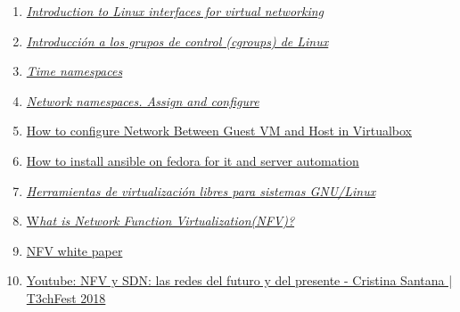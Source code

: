 \documentclass[12pt]{article}
\begin{document}
\begin{enumerate}
		\item
		\label{bib:virtual interface list}
		\href{https://developers.redhat.com/blog/2018/10/22/introduction-to-linux-interfaces-for-virtual-networking#veth}{\textit{Introduction to Linux interfaces for virtual networking}}
		
		
		\item
		\label{bib:link12}
		\href{https://elpuig.xeill.net/Members/vcarceler/articulos/introduccion-a-los-grupos-de-control-cgroups-de-linux}{\textit{Introducción a los grupos de control (cgroups) de Linux}}
		
		\item
		\label{bib:time ns kernel}
		\href{https://git.kernel.org/pub/scm/linux/kernel/git/tip/tip.git/commit/?h=timers/core&id=769071ac9f20b6a447410c7eaa55d1a5233ef40c}{\textit{Time namespaces}}
		
		\item
		\label{bib:example netns veth}
		\href{https://blog.scottlowe.org/2013/09/04/introducing-linux-network-namespaces/}{\textit{Network namespaces. Assign and configure}}
		
		
		\item
		\label{bib:configure host-only}
		\href{https://www.tecmint.com/network-between-guest-vm-and-host-virtualbox/}{How to configure Network Between Guest VM and Host in Virtualbox}
		
		
		\item
		\label{bib:install ansible}
		\href{https://www.cyberciti.biz/faq/how-to-install-ansible-on-fedora-for-it-and-server-automation/}{How to install ansible on fedora for it and server automation}
		
		\item
		\label{bib: herramientas virtualizacion}
		\href{https://www.uv.es/sto/charlas/2010_CIM/hvl-cim-2010.html/index.html}{\textit{Herramientas de virtualización libres para sistemas GNU/Linux}}
		
		\item
		\label{bib: what is nfv}
		\href{https://www.ciena.com/insights/articles/What-is-NFV-prx.html}{W\textit{hat is Network Function Virtualization(NFV)?}}
		
		\item
		\label{paper nfv 2012}
		\href{https://portal.etsi.org/nfv/nfv_white_paper.pdf}{NFV white paper}
		
		\item
		\label{youtube: nfv y sdn cristina}
		\href{https://www.youtube.com/watch?v=3JEAK66wujg}{Youtube: NFV y SDN: las redes del futuro y del presente - Cristina Santana | T3chFest 2018}
		

\end{enumerate}
\end{document}
